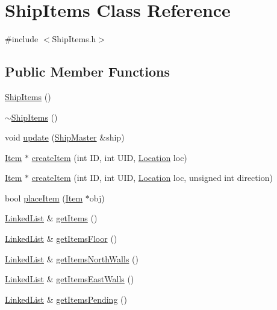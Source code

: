 \hypertarget{classShipItems}{\section{Ship\-Items Class Reference}
\label{classShipItems}
}


{\ttfamily \#include $<$Ship\-Items.\-h$>$}

\subsection*{Public Member Functions}
\begin{DoxyCompactItemize}
\item 
\hyperlink{classShipItems_adc14b59e747ba46333bdd33b864392c6}{Ship\-Items} ()
\item 
\hyperlink{classShipItems_a41194d8cb17bfaa10a5cd6abb80ba78b}{$\sim$\-Ship\-Items} ()
\item 
void \hyperlink{classShipItems_a3a5ab7ad8035ae1b3b6da0483f5ce792}{update} (\hyperlink{classShipMaster}{Ship\-Master} \&ship)
\item 
\hyperlink{classItem}{Item} $\ast$ \hyperlink{classShipItems_a49cdd4419f853d178c0cc1afd105121a}{create\-Item} (int I\-D, int U\-I\-D, \hyperlink{structLocation}{Location} loc)
\item 
\hyperlink{classItem}{Item} $\ast$ \hyperlink{classShipItems_a61bdf01e758998d328b172e241aa816a}{create\-Item} (int I\-D, int U\-I\-D, \hyperlink{structLocation}{Location} loc, unsigned int direction)
\item 
bool \hyperlink{classShipItems_a838f560346a9d7b0f1bb128aaf93b1c7}{place\-Item} (\hyperlink{classItem}{Item} $\ast$obj)
\item 
\hyperlink{classLinkedList}{Linked\-List} \& \hyperlink{classShipItems_adf57cc0e0699cb38bdb29e8d45b1243d}{get\-Items} ()
\item 
\hyperlink{classLinkedList}{Linked\-List} \& \hyperlink{classShipItems_a334be479ae34538c698413213690b829}{get\-Items\-Floor} ()
\item 
\hyperlink{classLinkedList}{Linked\-List} \& \hyperlink{classShipItems_aa5d2ec2c87801bc7340fdddc65ec95a4}{get\-Items\-North\-Walls} ()
\item 
\hyperlink{classLinkedList}{Linked\-List} \& \hyperlink{classShipItems_adf71794304e06b37678c3eeee818f56b}{get\-Items\-East\-Walls} ()
\item 
\hyperlink{classLinkedList}{Linked\-List} \& \hyperlink{classShipItems_ac77750d78a0d268e330940a73961238f}{get\-Items\-Pending} ()

\end{DoxyCompactItemize}
